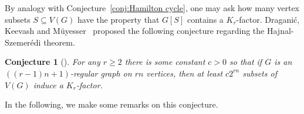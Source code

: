 \documentclass[11pt, a4paper]{article}
\newtheorem{conjecture}[theorem]{Conjecture}
\theoremstyle{definition}
\newcommand{\<}{\subseteq}
\begin{document}
By analogy with Conjecture~\ref{conj:Hamilton cycle}, one may ask how many vertex subsets $S\subseteq V(G)$ have the property that $G[S]$ contains a $K_r$-factor.   Dragani\'{c}, Keevash and M\"{u}yesser~\cite{Keevash2025} proposed the following {conjecture regarding the Hajnal-Szemer\'{e}di theorem.} %
\begin{conjecture}[\cite{Keevash2025}]\label{conj:K_r factor}
For any $r\ge 2$ there is some constant $c>0$ so that if $G$ is an $((r-1)n+1)$-regular graph on $rn$ vertices, then at least $c2^{rn}$ subsets of $V(G)$ induce a $K_r$-factor.
\end{conjecture}

In the following, we make some remarks on this conjecture. %
\end{document}
